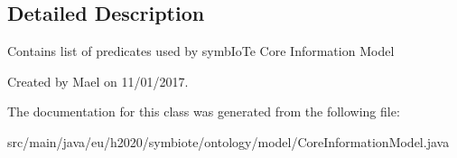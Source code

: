 \subsection{Detailed Description}
Contains list of predicates used by symb\+Io\+Te Core Information Model

Created by Mael on 11/01/2017. 

The documentation for this class was generated from the following file\+:\begin{DoxyCompactItemize}
\item 
src/main/java/eu/h2020/symbiote/ontology/model/Core\+Information\+Model.\+java\end{DoxyCompactItemize}
